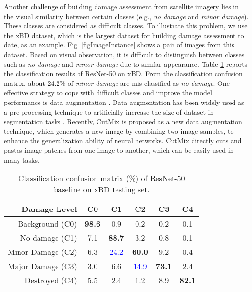 \documentclass[journal]{IEEEtran}
\begin{document}
Another challenge of building damage assessment from satellite imagery lies in the visual similarity between certain classes (e.g., \textit{no damage} and \textit{minor damage}). These classes are considered as difficult classes. To illustrate this problem, we use the xBD \cite{gupta2019xbd} dataset, which is the largest dataset for building damage assessment to date, as an example. Fig. \ref{figImageInstance} shows a pair of images from this dataset. Based on visual observation, it is difficult to distinguish between classes such as \textit{no damage} and \textit{minor damage} due to similar appearance. Table \ref{tabBase} reports the classification results of  ResNet-50 on xBD. From the classification confusion matrix, about 24.2\% of \emph{minor damage} are mis-classified as \emph{no damage}. 
One effective strategy to cope with difficult classes and improve the model performance is data augmentation \cite{shorten2019survey,cubuk2019autoaugment}. Data augmentation has been widely used as a pre-processing technique to artificially increase the size of dataset in segmentation tasks \cite{ myronenko20183d}. Recently, CutMix \cite{yun2019cutmix} is proposed as a new data augmentation technique, which generates a new image by combining two image samples, to enhance the generalization ability of neural networks. CutMix directly cuts and pastes image patches from one image to another, which can be easily used in many tasks.


\begin{table}[t]
	\centering
	\caption{Classification confusion matrix (\%)  of ResNet-50 baseline on xBD testing set.}
	\begin{tabular}{rccccc}
	\hline
	\hline
	  Damage Level  & C0 & C1 & C2  & C3 & C4 \\
    \hline
    Background (C0) &\textbf{98.6} &	0.9 &	0.2&	0.2 &	0.1 \\
    No damage (C1) & 7.1&	\textbf{88.7} &	3.2&	0.8&	0.1\\
    Minor Damage (C2) & 6.3 &	\textcolor{blue}{24.2}&	\textbf{60.0} &	9.2&	0.4\\
    Major Damage (C3)  & 3.0 &	6.6	& \textcolor{blue}{14.9}&	\textbf{73.1} &	2.4\\
    Destroyed (C4) & 5.5 &	2.4&	1.2&	8.9&	 \textbf{82.1} \\
\hline
\hline
	\end{tabular}
\label{tabBase}
\end{table}
\end{document}
